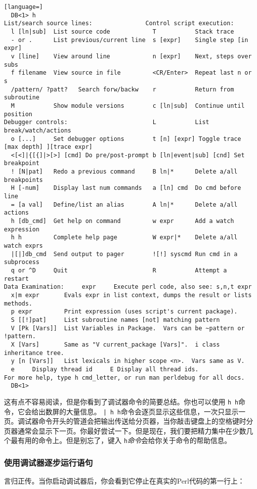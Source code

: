 \begin{lstlisting}[language=]
  DB<1> h
List/search source lines:               Control script execution:
  l [ln|sub]  List source code            T           Stack trace
  - or .      List previous/current line  s [expr]    Single step [in expr]
  v [line]    View around line            n [expr]    Next, steps over subs
  f filename  View source in file         <CR/Enter>  Repeat last n or s
  /pattern/ ?patt?   Search forw/backw    r           Return from subroutine
  M           Show module versions        c [ln|sub]  Continue until position
Debugger controls:                        L           List break/watch/actions
  o [...]     Set debugger options        t [n] [expr] Toggle trace [max depth] ][trace expr]
  <[<]|{[{]|>[>] [cmd] Do pre/post-prompt b [ln|event|sub] [cnd] Set breakpoint
  ! [N|pat]   Redo a previous command     B ln|*      Delete a/all breakpoints
  H [-num]    Display last num commands   a [ln] cmd  Do cmd before line
  = [a val]   Define/list an alias        A ln|*      Delete a/all actions
  h [db_cmd]  Get help on command         w expr      Add a watch expression
  h h         Complete help page          W expr|*    Delete a/all watch exprs
  |[|]db_cmd  Send output to pager        ![!] syscmd Run cmd in a subprocess
  q or ^D     Quit                        R           Attempt a restart
Data Examination:     expr     Execute perl code, also see: s,n,t expr
  x|m expr       Evals expr in list context, dumps the result or lists methods.
  p expr         Print expression (uses script's current package).
  S [[!]pat]     List subroutine names [not] matching pattern
  V [Pk [Vars]]  List Variables in Package.  Vars can be ~pattern or !pattern.
  X [Vars]       Same as "V current_package [Vars]".  i class inheritance tree.
  y [n [Vars]]   List lexicals in higher scope <n>.  Vars same as V.
  e     Display thread id     E Display all thread ids.
For more help, type h cmd_letter, or run man perldebug for all docs.
  DB<1> 
\end{lstlisting}

这有点不容易阅读，但是你看到了调试器命令的简要总结。你也可以使用 \verb|h h|命令，它会给出数屏的大量信息。 \verb=| h h=命令会逐页显示这些信息，一次只显示一页。调试器命令开头的管道会把输出传送给分页器，当你敲击键盘上的空格键时分页器通常会显示下一页。你最好尝试一下。但是现在，我们要把精力集中在少数几个最有用的命令上。但是别忘了，键入 \verb|h|\textit{命令}会给你关于命令的帮助信息。

\subsubsection{使用调试器逐步运行语句}
言归正传。当你启动调试器后，你会看到它停止在真实的Perl代码的第一行上：

